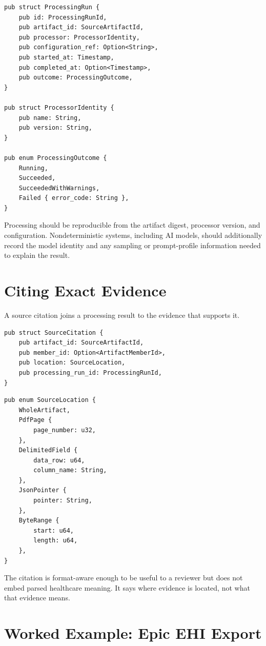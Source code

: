 \documentclass[11pt]{article}
\begin{document}
\begin{lstlisting}
pub struct ProcessingRun {
    pub id: ProcessingRunId,
    pub artifact_id: SourceArtifactId,
    pub processor: ProcessorIdentity,
    pub configuration_ref: Option<String>,
    pub started_at: Timestamp,
    pub completed_at: Option<Timestamp>,
    pub outcome: ProcessingOutcome,
}

pub struct ProcessorIdentity {
    pub name: String,
    pub version: String,
}

pub enum ProcessingOutcome {
    Running,
    Succeeded,
    SucceededWithWarnings,
    Failed { error_code: String },
}
\end{lstlisting}

Processing should be reproducible from the artifact digest, processor version, and configuration. Nondeterministic systems, including AI models, should additionally record the model identity and any sampling or prompt-profile information needed to explain the result.

\Needspace{0.34\textheight}
\section{Citing Exact Evidence}

A source citation joins a processing result to the evidence that supports it.

\begin{lstlisting}
pub struct SourceCitation {
    pub artifact_id: SourceArtifactId,
    pub member_id: Option<ArtifactMemberId>,
    pub location: SourceLocation,
    pub processing_run_id: ProcessingRunId,
}
\end{lstlisting}

\Needspace{0.30\textheight}
\begin{lstlisting}
pub enum SourceLocation {
    WholeArtifact,
    PdfPage {
        page_number: u32,
    },
    DelimitedField {
        data_row: u64,
        column_name: String,
    },
    JsonPointer {
        pointer: String,
    },
    ByteRange {
        start: u64,
        length: u64,
    },
}
\end{lstlisting}

The citation is format-aware enough to be useful to a reviewer but does not embed parsed healthcare meaning. It says where evidence is located, not what that evidence means.

\section{Worked Example: Epic EHI Export}
\end{document}
